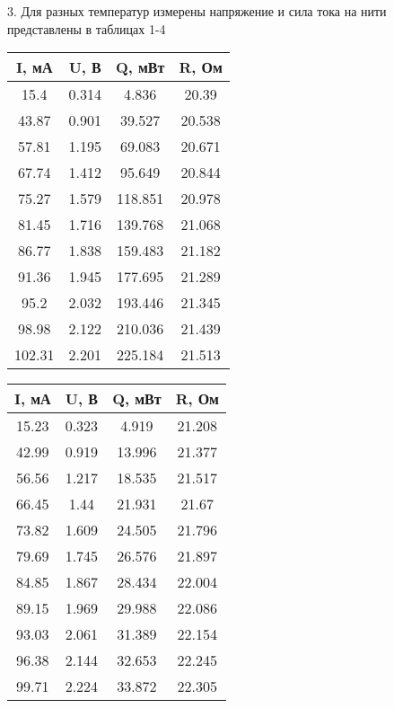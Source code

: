 3. Для разных температур измерены напряжение и сила тока на нити представлены в таблицах 1-4
\begin{table}
    \begin{tabular}{|c|c|c|c|}
    \hline
    I, мА & U, В & Q, мВт & R, Ом \\
    \hline
    15.4 & 0.314 & 4.836 & 20.39 \\
    \hline
    43.87 & 0.901 & 39.527 & 20.538 \\
    \hline
    57.81 & 1.195 & 69.083 & 20.671 \\
    \hline
    67.74 & 1.412 & 95.649 & 20.844 \\
    \hline
    75.27 & 1.579 & 118.851 & 20.978 \\
    \hline
    81.45 & 1.716 & 139.768 & 21.068 \\
    \hline
    86.77 & 1.838 & 159.483 & 21.182 \\
    \hline
    91.36 & 1.945 & 177.695 & 21.289 \\
    \hline
    95.2 & 2.032 & 193.446 & 21.345 \\
    \hline
    98.98 & 2.122 & 210.036 & 21.439 \\
    \hline
    102.31 & 2.201 & 225.184 & 21.513 \\
    \hline
    \end{tabular}
\hfill
    \begin{tabular}{|c|c|c|c|}
    \hline
    I, мА & U, В & Q, мВт & R, Ом \\
    \hline
    15.23 & 0.323 & 4.919 & 21.208 \\
    \hline
    42.99 & 0.919 & 13.996 & 21.377 \\
    \hline
    56.56 & 1.217 & 18.535 & 21.517 \\
    \hline
    66.45 & 1.44 & 21.931 & 21.67 \\
    \hline
    73.82 & 1.609 & 24.505 & 21.796 \\
    \hline
    79.69 & 1.745 & 26.576 & 21.897 \\
    \hline
    84.85 & 1.867 & 28.434 & 22.004 \\
    \hline
    89.15 & 1.969 & 29.988 & 22.086 \\
    \hline
    93.03 & 2.061 & 31.389 & 22.154 \\
    \hline
    96.38 & 2.144 & 32.653 & 22.245 \\
    \hline
    99.71 & 2.224 & 33.872 & 22.305 \\
    \hline
    \end{tabular}
\hfill
    \begin{tabular}{|c|c|c|c|}

\end{tabular}
\end{table}
